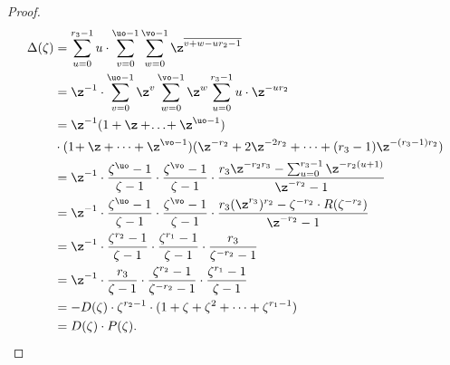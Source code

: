 \begin{proof}
\begin{equation*}
\begin{split}
\Delta(\zeta)&=
\sum_{u=0}^{r_3-1}u\cdot\sum_{v=0}^{\uo-1} \sum _{w=0}^{\vo-1} \z^{\overline{v+w-ur_2-1}}\\
&=\z^{-1}\cdot\sum_{v=0}^{\uo-1}\z^v \sum _{w=0}^{\vo-1} \z^{w}\sum_{u=0}^{r_3-1}u\cdot\z^{-ur_2}\\
&=\z^{-1}(1+\z+\!\dots\!+\z^{\uo-1})\\
&\cdot(1\!+\z+\dots+\z^{\vo-1})(\z^{-r_2}+2\z^{-2r_2}+\dots+(r_3-1)\z^{-(r_3-1)r_2})\\
&=\z^{-1} \cdot \frac{\zeta^{\uo}-1}{\zeta-1}\cdot \frac{\zeta^{\vo}-1}{\zeta-1}\cdot \frac{r_3\z^{-r_2r_3}-\sum_{u=0}^{r_3-1}\z^{-r_2(u+1)}}{\z^{-r_2}-1}
\\
&=\z^{-1} \cdot \frac{\zeta^{\uo}-1}{\zeta-1}\cdot \frac{\zeta^{\vo}-1}{\zeta-1}\cdot \frac{r_3(\z^{r_3})^{r_2}-\zeta^{-r_2}\cdot R(\zeta^{-r_2})}{\z^{-r_2}-1}
\\
&=\z^{-1}\cdot\frac{\zeta^{r_2}-1}{\zeta-1}\cdot \frac{\zeta^{r_1}-1}{\zeta-1} \cdot \frac{r_3}{\zeta^{-r_2}-1}\\
&=\z^{-1}\cdot\frac{r_3}{\zeta-1}\cdot \frac{\zeta^{r_2}-1}{\zeta^{-r_2}-1}\cdot \frac{\zeta^{r_1}-1}{\zeta-1}\\
&=-D(\zeta)\cdot \zeta^{r_2-1}\cdot (1+\zeta+\zeta^2+\dots+\zeta^{r_1-1})\\
&=D(\zeta)\cdot P(\zeta). \qedhere
\end{split}
\end{equation*}
\end{proof}

